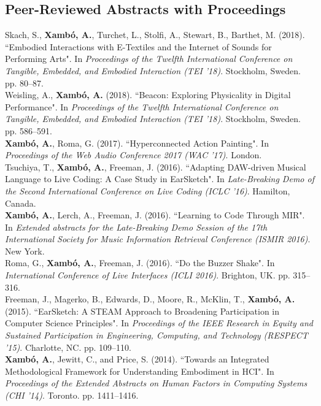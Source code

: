 \documentclass[10pt, a4paper]{article}
\newcommand{\years}[1]{\marginnote{\scriptsize #1}}
\begin{document}
\subsection*{Peer-Reviewed Abstracts with Proceedings}
\noindent
\years{2018b}Skach, S., \textbf{Xambó, A.}, Turchet, L., Stolfi, A., Stewart, B., Barthet, M. (2018). “Embodied Interactions with E-Textiles and the Internet of Sounds for Performing Arts". In \emph{Proceedings of the Twelfth International Conference on Tangible, Embedded, and Embodied Interaction (TEI '18)}. Stockholm, Sweden. pp. 80--87.\\
\years{2018a}Weisling, A., \textbf{Xambó, A.} (2018). “Beacon: Exploring Physicality in Digital Performance". In \emph{Proceedings of the Twelfth International Conference on Tangible, Embedded, and Embodied Interaction (TEI '18)}. Stockholm, Sweden. pp. 586--591.\\
\years{2017a}\textbf{Xambó, A.}, Roma, G. (2017). “Hyperconnected Action Painting". In \emph{Proceedings of the Web Audio Conference 2017 (WAC '17)}. London.\\
\years{2016c}Tsuchiya, T., \textbf{Xambó, A.}, Freeman, J. (2016). “Adapting DAW-driven Musical Language to Live Coding: A Case Study in EarSketch". In \emph{Late-Breaking Demo of the Second International Conference on Live Coding (ICLC '16)}. Hamilton, Canada.\\ 
\years{2016b}\textbf{Xambó, A.}, Lerch, A., Freeman, J. (2016). “Learning to Code Through MIR". In \emph{Extended abstracts for the Late-Breaking Demo Session of the 17th International Society for Music Information Retrieval Conference (ISMIR 2016)}. New York.\\
\years{2016a}Roma, G., \textbf{Xambó, A.}, Freeman, J. (2016). “Do the Buzzer Shake". In \emph{International Conference of Live Interfaces (ICLI 2016)}. Brighton, UK. pp. 315--316.\\
\years{2015}Freeman, J., Magerko, B., Edwards, D., Moore, R., McKlin, T., \textbf{Xambó, A.} (2015). “EarSketch: A STEAM Approach to Broadening Participation in Computer Science Principles". In \emph{Proceedings of the IEEE Research in Equity and Sustained Participation in Engineering, Computing, and Technology (RESPECT '15)}. Charlotte, NC. pp. 109--110.\\
\years{2014}\textbf{Xambó, A.}, Jewitt, C., and Price, S. (2014). “Towards an Integrated Methodological Framework for Understanding Embodiment in HCI". In \emph{Proceedings of the Extended Abstracts on Human Factors in Computing Systems (CHI '14)}. Toronto. pp. 1411--1416.
\end{document}

